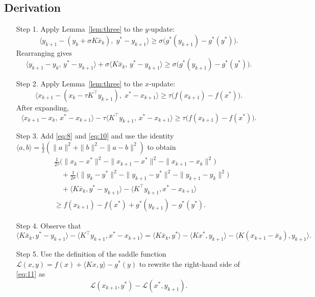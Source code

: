 \documentclass{article}
\begin{document}
\subsection*{Derivation}
\begin{enumerate}
\item[Step 1.] Apply Lemma~\ref{lem:three} to the $y$‑update:
\[
\langle y_{k+1}- (y_{k}+\sigma K\bar{x}_{k}),\;
      y^{*}-y_{k+1}\rangle
      \ge \sigma\bigl(g^{*}(y_{k+1})-g^{*}(y^{*})\bigr).
\tag{7}
\]
Rearranging gives
\[
\langle y_{k+1}-y_{k},\,y^{*}-y_{k+1}\rangle
      +\sigma\langle K\bar{x}_{k},\,y^{*}-y_{k+1}\rangle
      \ge \sigma\bigl(g^{*}(y_{k+1})-g^{*}(y^{*})\bigr).
\tag{8}
\]

\item[Step 2.] Apply Lemma~\ref{lem:three} to the $x$‑update:
\[
\langle x_{k+1}- (x_{k}-\tau K^{\!\top}y_{k+1}),\;
      x^{*}-x_{k+1}\rangle
      \ge \tau\bigl(f(x_{k+1})-f(x^{*})\bigr).
\tag{9}
\]
After expanding,
\[
\langle x_{k+1}-x_{k},\,x^{*}-x_{k+1}\rangle
      -\tau\langle K^{\!\top}y_{k+1},\,x^{*}-x_{k+1}\rangle
      \ge \tau\bigl(f(x_{k+1})-f(x^{*})\bigr).
\tag{10}
\]

\item[Step 3.] Add \eqref{eq:8} and \eqref{eq:10} and use the identity
$\langle a,b\rangle =\frac12(\|a\|^{2}+\|b\|^{2}-\|a-b\|^{2})$ to obtain
\[
\begin{aligned}
&\frac{1}{2\tau}\bigl(\|x_{k}-x^{*}\|^{2}-\|x_{k+1}-x^{*}\|^{2}
                     -\|x_{k+1}-x_{k}\|^{2}\bigr)\\
&\quad+\frac{1}{2\sigma}\bigl(\|y_{k}-y^{*}\|^{2}-\|y_{k+1}-y^{*}\|^{2}
                     -\|y_{k+1}-y_{k}\|^{2}\bigr)\\
&\quad+\langle K\bar{x}_{k},y^{*}-y_{k+1}\rangle
      -\langle K^{\!\top}y_{k+1},x^{*}-x_{k+1}\rangle  \\
&\ge f(x_{k+1})-f(x^{*})+g^{*}(y_{k+1})-g^{*}(y^{*}).
\end{aligned}
\tag{11}
\]

\item[Step 4.] Observe that
\[
\langle K\bar{x}_{k},y^{*}-y_{k+1}\rangle
-\langle K^{\!\top}y_{k+1},x^{*}-x_{k+1}\rangle
=
\langle K\bar{x}_{k},y^{*}\rangle
-\langle Kx^{*},y_{k+1}\rangle
-\langle K(x_{k+1}-\bar{x}_{k}),y_{k+1}\rangle.
\tag{12}
\]

\item[Step 5.] Use the definition of the saddle function
$\mathcal{L}(x,y)=f(x)+\langle Kx,y\rangle-g^{*}(y)$ to rewrite the right‑hand side of \eqref{eq:11} as
\[
\mathcal{L}(x_{k+1},y^{*})-\mathcal{L}(x^{*},y_{k+1}).
\tag{13}
\]


\end{enumerate}
\end{document}
